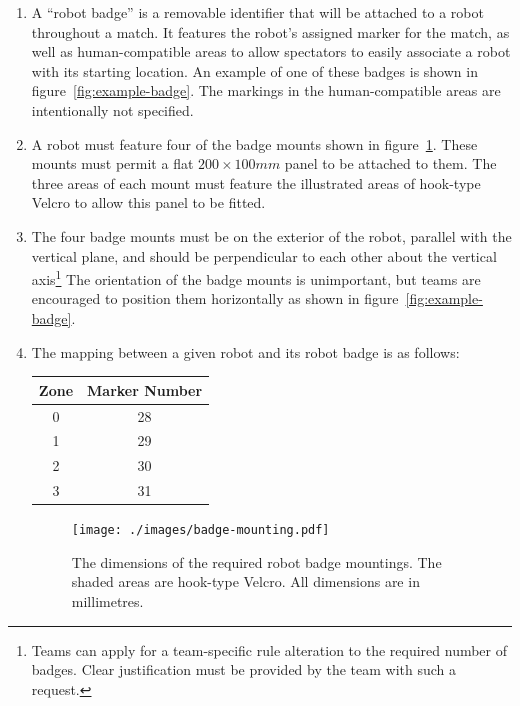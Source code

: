 \begin{enumerate}
\item A ``robot badge'' is a removable identifier that will be attached to a robot throughout a match.
      It features the robot's assigned marker for the match, as well as human-compatible areas to allow spectators to easily associate a robot with its starting location.
      An example of one of these badges is shown in figure~\ref{fig:example-badge}.
      The markings in the human-compatible areas are intentionally not specified.

\item A robot must feature four of the badge mounts shown in figure~\ref{fig:badge-mounting}.
      These mounts must permit a flat $200 \times 100mm$ panel to be attached to them.
      The three areas of each mount must feature the illustrated areas of hook-type Velcro to allow this panel to be fitted.

\item The four badge mounts must be on the exterior of the robot, parallel with the vertical plane, and should be perpendicular to each other about the vertical axis\footnote{Teams can apply for a team-specific rule alteration to the required number of badges.
      Clear justification must be provided by the team with such a request.}
      The orientation of the badge mounts is unimportant, but teams are encouraged to position them horizontally as shown in figure~\ref{fig:example-badge}.

\item The mapping between a given robot and its robot badge is as follows:

\begin{center}
  \begin{tabular}{cc}
    \toprule
    \textbf{Zone} & \textbf{Marker Number} \\
    \midrule
    0 & 28 \\
    1 & 29 \\
    2 & 30 \\
    3 & 31 \\
    \bottomrule
  \end{tabular}
\end{center}

\begin{figure}
  \centering
  \texttt{[image: ./images/badge-mounting.pdf]}
  \caption{The dimensions of the required robot badge mountings.
           The shaded areas are hook-type Velcro.
           All dimensions are in millimetres.}
  \label{fig:badge-mounting}
\end{figure}

\end{enumerate}


